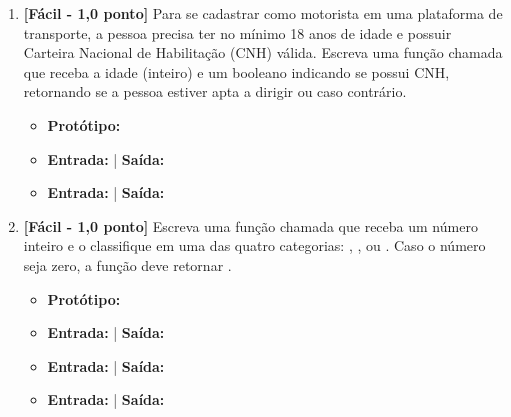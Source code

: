 \begin{enumerate}[label=\textbf{Q\arabic*.}, start=11]


\vspace{0.4cm}

\item \textbf{[Fácil - 1,0 ponto]} Para se cadastrar como motorista em uma plataforma de transporte, a pessoa precisa ter no mínimo 18 anos de idade e possuir Carteira Nacional de Habilitação (CNH) válida. Escreva uma função chamada  que receba a idade (inteiro) e um booleano indicando se possui CNH, retornando  se a pessoa estiver apta a dirigir ou  caso contrário.

\begin{itemize}[leftmargin=*]
    \item \textbf{Protótipo:}\newline {}
    \item \textbf{Entrada:}  | \textbf{Saída:} 
    \item \textbf{Entrada:}  | \textbf{Saída:} 
\end{itemize}



\vspace{0.4cm}

\item \textbf{[Fácil - 1,0 ponto]} Escreva uma função chamada  que receba um número inteiro e o classifique em uma das quatro categorias: , ,  ou . Caso o número seja zero, a função deve retornar .

\begin{itemize}[leftmargin=*]
    \item \textbf{Protótipo:}\newline {}
    \item \textbf{Entrada:}  | \textbf{Saída:} 
    \item \textbf{Entrada:}  | \textbf{Saída:} 
    \item \textbf{Entrada:}  | \textbf{Saída:} 
\end{itemize}



\vspace{0.4cm}


\end{enumerate}
